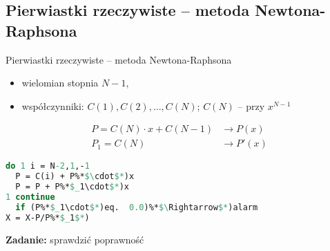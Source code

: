 \subsection{Pierwiastki rzeczywiste -- metoda Newtona-Raphsona}

\begin{frame}{Pierwiastki rzeczywiste -- metoda Newtona-Raphsona}
  \begin{itemize}
    \item wielomian stopnia $N-1$,
    \item współczynniki: $C(1), C(2), \dots, C(N)$; $C(N)$ -- przy $x^{N-1}$
  \end{itemize}

  $$\begin{array}{ll}
  P = C(N) \cdot x + C(N-1) & \rightarrow P(x) \\
  P_1 = C(N) & \rightarrow P'(x)
  \end{array}$$
\end{frame}

\begin{frame}[fragile]
  \begin{lstlisting}[language=Pascal]
do 1 i = N-2,1,-1
  P = C(i) + P%*$\cdot$*)x
  P = P + P%*$_1\cdot$*)x
1 continue
  if (P%*$_1\cdot$*)eq.  0.0)%*$\Rightarrow$*)alarm
X = X-P/P%*$_1$*)
\end{lstlisting}

  \textbf{Zadanie:} sprawdzić poprawność
\end{frame}
